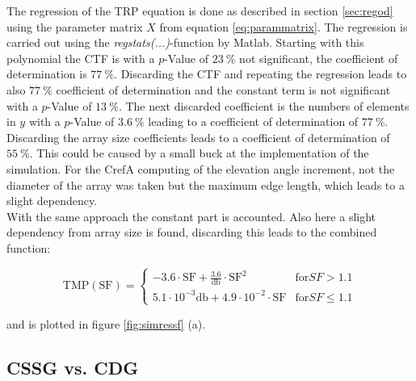 The regression of the \ac{TRP} equation is done as described in section \ref{sec:regod} using the parameter matrix $X$ from equation \ref{eq:parammatrix}. The regression is carried out using the \textit{regstats(...)}-function by Matlab\texttrademark{}. Starting with this polynomial the \ac{CTF} is with a $p$-Value of $\SI{23}{\percent}$ not significant, the coefficient of determination is $\SI{77}{\percent}$. Discarding the \ac{CTF} and repeating the regression leads to also $\SI{77}{\percent}$ coefficient of determination and the constant term is not significant with a $p$-Value of $\SI{13}{\percent}$. The next discarded coefficient is the numbers of elements in $y$ with a  $p$-Value of $\SI{3.6}{\percent}$ leading to a coefficient of determination of $\SI{77}{\percent}$. Discarding the array size coefficients leads to a coefficient of determination of $\SI{55}{\percent}$. This could be caused by a small buck at the implementation of the simulation. For the \ac{CrefA} computing of the elevation angle increment, not the diameter of the array was taken but the maximum edge length, which leads to a slight dependency.\\
With the same approach the constant part is accounted. Also here a slight dependency from array size is found, discarding this leads to the combined function:

\begin{equation}
\text{TMP}\left(\text{SF}\right)=\begin{cases} -3.6\cdot\text{SF}+\frac{3.6}{\si{\decibel}}\cdot\text{SF}^2 & \text{for} SF>1.1\\
5.1\cdot 10^{-3}\si{\decibel}+4.9\cdot 10^{-2}\cdot \text{SF} & \text{for} SF\le 1.1\end{cases}
\end{equation}

and is plotted in figure \ref{fig:simressf} (a).

\subsection{CSSG vs. CDG}